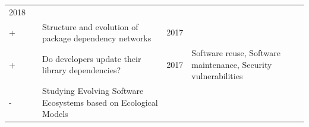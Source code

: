 \documentclass[]{book}
\begin{document}
\begin{longtable}[]{@{}lllll@{}}
\begin{minipage}[t]{0.02\columnwidth}
2018\strut
\end{minipage} & \begin{minipage}[t]{0.39\columnwidth}\raggedright\strut
\strut
\end{minipage}\tabularnewline
\begin{minipage}[t]{0.01\columnwidth}\raggedright\strut
+\strut
\end{minipage} & \begin{minipage}[t]{0.09\columnwidth}\raggedright\strut
\citet{Kikas2017}\strut
\end{minipage} & \begin{minipage}[t]{0.34\columnwidth}\raggedright\strut
Structure and evolution of package dependency networks\strut
\end{minipage} & \begin{minipage}[t]{0.02\columnwidth}\raggedright\strut
2017\strut
\end{minipage} & \begin{minipage}[t]{0.39\columnwidth}\raggedright\strut
\strut
\end{minipage}\tabularnewline
\begin{minipage}[t]{0.01\columnwidth}\raggedright\strut
+\strut
\end{minipage} & \begin{minipage}[t]{0.09\columnwidth}\raggedright\strut
\citet{Kula2017}\strut
\end{minipage} & \begin{minipage}[t]{0.34\columnwidth}\raggedright\strut
Do developers update their library dependencies?\strut
\end{minipage} & \begin{minipage}[t]{0.02\columnwidth}\raggedright\strut
2017\strut
\end{minipage} & \begin{minipage}[t]{0.39\columnwidth}\raggedright\strut
Software reuse, Software maintenance, Security vulnerabilities\strut
\end{minipage}\tabularnewline
\begin{minipage}[t]{0.01\columnwidth}\raggedright\strut
-\strut
\end{minipage} & \begin{minipage}[t]{0.09\columnwidth}\raggedright\strut
\citet{Mens2013}\strut
\end{minipage} & \begin{minipage}[t]{0.34\columnwidth}\raggedright\strut
Studying Evolving Software Ecosystems based on Ecological Models\strut
\end{minipage} & \begin{minipage}[t]{0.02\columnwidth}\raggedright\strut

\end{minipage}
\end{longtable}
\end{document}
